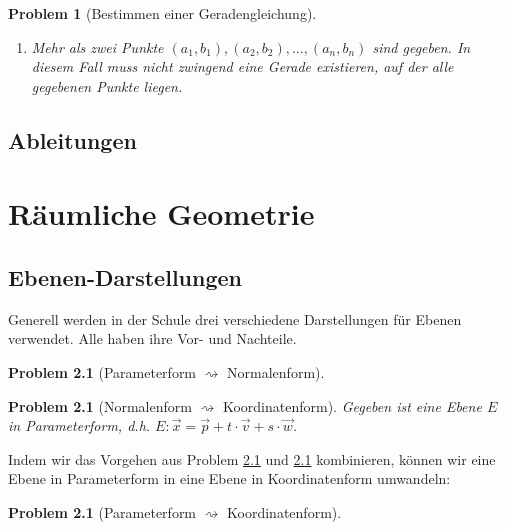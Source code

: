 \documentclass[11pt,reqno, a4paper]{book}
\theoremstyle{mystyle}
\newtheorem{problem}[theorem]{Problem}
\theoremstyle{definition}
\numberwithin{equation}{chapter}
\begin{document}
\begin{problem}[Bestimmen einer Geradengleichung]
\begin{enumerate}
        \item Mehr als zwei Punkte \((a_1, b_1), (a_2, b_2), \dots, (a_n, b_n)\) sind gegeben. In diesem Fall muss nicht zwingend eine Gerade existieren, auf der alle gegebenen Punkte liegen. \par
        \begin{normalfont}
            
        \end{normalfont}
    \end{enumerate}
\end{problem}

\section{Ableitungen}

\chapter{Räumliche Geometrie}

\section{Ebenen-Darstellungen}
Generell werden in der Schule drei verschiedene Darstellungen für Ebenen verwendet. Alle haben ihre Vor- und Nachteile. 

\begin{problem}[Parameterform  \(\rightsquigarrow\) Normalenform] \label{prob:parameterf-normalenf}
    
\end{problem}

\begin{problem}[Normalenform \(\rightsquigarrow\) Koordinatenform] \label{prob:normalenf-koordf}
    Gegeben ist eine Ebene \(E\) in Parameterform, d.h. \(E: \vec x = \vec p + t \cdot \vec v + s\cdot \vec w\). 
\end{problem}

Indem wir das Vorgehen aus Problem \ref{prob:parameterf-normalenf} und \ref{prob:normalenf-koordf} kombinieren, können wir eine Ebene in Parameterform in eine Ebene in Koordinatenform umwandeln: 

\begin{problem}[Parameterform \(\rightsquigarrow\) Koordinatenform]
    
\end{problem}
\end{document}
